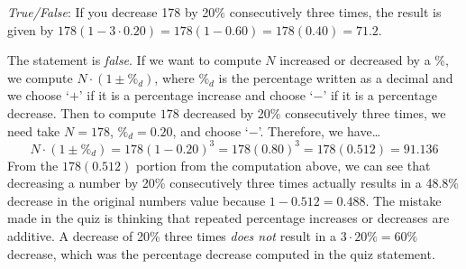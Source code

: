 \documentclass[11pt,letterpaper]{article}
\begin{document}
\thispagestyle{title}

\quizsol \textit{True/False}: If you decrease 178 by 20\% consecutively three times, the result is given by $178 (1 - 3 \cdot 0.20)= 178(1 - 0.60)= 178(0.40)= 71.2$.  \pspace

\sol The statement is \textit{false}. If we want to compute $N$ increased or decreased by a \%, we compute $N \cdot (1 \pm \%_d)$, where $\%_d$ is the percentage written as a decimal and we choose `$+$' if it is a percentage increase and choose `$-$' if it is a percentage decrease. Then to compute $178$ decreased by 20\% consecutively three times, we need take $N= 178$, $\%_d= 0.20$, and choose `$-$'. Therefore, we have\dots
	\[
	N \cdot (1 \pm \%_d)= 178 (1 - 0.20)^3= 178(0.80)^3= 178(0.512)= 91.136
	\]
From the $178(0.512)$ portion from the computation above, we can see that decreasing a number by 20\% consecutively three times actually results in a 48.8\% decrease in the original numbers value because $1 - 0.512= 0.488$. The mistake made in the quiz is thinking that repeated percentage increases or decreases are additive. A decrease of 20\% three times \textit{does not} result in a $3 \cdot 20\%= 60\%$ decrease, which was the percentage decrease computed in the quiz statement. 
\end{document}
